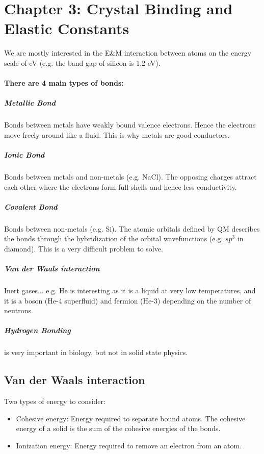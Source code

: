 \documentclass[../main.tex]{subfiles}
\begin{document}
\pagestyle{fancy}

\section*{Chapter 3: Crystal Binding and Elastic Constants}

We are mostly interested in the E\&M interaction between atoms on the energy scale of eV (e.g. the
band gap of silicon is 1.2 eV). 

\paragraph{There are 4 main types of bonds:}

\subparagraph*{Metallic Bond} Bonds between metals have weakly bound valence electrons. Hence the
electrons move freely around like a fluid. This is why metals are good conductors.

\subparagraph*{Ionic Bond} Bonds between metals and non-metals (e.g. NaCl). The opposing charges
attract each other where the electrons form full shells and hence less conductivity.

\subparagraph*{Covalent Bond} Bonds between non-metals (e.g. Si). The atomic orbitals defined by
QM describes the bonds through the hybridization of the orbital wavefunctions (e.g. $sp^3$ in
diamond). This is a very difficult problem to solve.

\subparagraph*{Van der Waals interaction} Inert gases... e.g. He is interesting as it is a liquid at
very low temperatures, and it is a boson (He-4 superfluid) and fermion (He-3) depending on the
number of neutrons. 

\subparagraph*{Hydrogen Bonding} is very important in biology, but not in solid state physics.

\subsection*{Van der Waals interaction}

Two types of energy to consider:
\begin{itemize}
\item Cohesive energy: Energy required to separate bound atoms. The cohesive energy of a solid
is the sum of the cohesive energies of the bonds. 
\item Ionization energy: Energy required to remove an electron from an atom.
\end{itemize}
\end{document}
